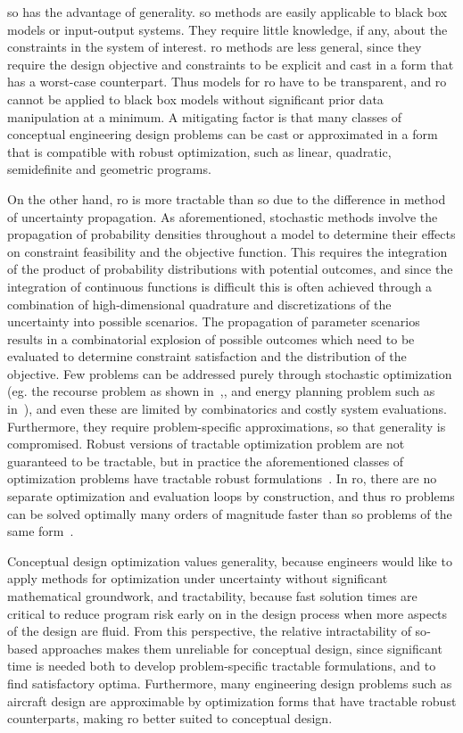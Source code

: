 \gls{so} has the advantage of generality.
\gls{so} methods are easily applicable to black box models or input-output systems.
They require little knowledge, if any, about the constraints in the system of interest.
\gls{ro} methods are less general, since they require
the design objective and constraints to be explicit and cast in a form that has a worst-case
counterpart. Thus models for \gls{ro} have to be transparent,
and \gls{ro} cannot be applied to black box models without significant prior data
manipulation at a minimum. A mitigating factor is that
many classes of conceptual engineering design problems can be cast or approximated in a form that
is compatible with robust optimization, such as linear, quadratic, semidefinite
and geometric programs.

On the other hand, \gls{ro} is more tractable than \gls{so} due to the difference in method of uncertainty propagation.
As aforementioned, stochastic methods involve the propagation of probability densities throughout a model
to determine their effects on constraint feasibility and the objective function.
This requires the integration of the product of probability distributions with potential outcomes,
and since the integration of continuous functions is difficult this is often achieved through
a combination of high-dimensional quadrature and discretizations of the uncertainty into
possible scenarios. The propagation of parameter
scenarios results in a combinatorial explosion of possible outcomes which need to be evaluated to determine constraint
satisfaction and the distribution of the objective. Few problems can be addressed purely
through stochastic optimization (eg. the recourse problem as
shown in~\cite{Kall1982},\cite{Higle1991}, and energy planning problem such as in~\cite{Pereira1991}), and
even these are limited by combinatorics and costly system evaluations. Furthermore, they require
problem-specific approximations, so that generality is compromised.
Robust versions of tractable optimization problem are not
guaranteed to be tractable, but in practice the aforementioned classes of optimization problems
have tractable robust formulations~\cite{Bertsimas2011}. In \gls{ro},
there are no separate optimization and evaluation
loops by construction, and thus \gls{ro} problems can be solved optimally
many orders of magnitude faster than \gls{so} problems of the same form~\cite{Bertsimas2011}.

Conceptual design optimization values generality, because engineers would like to
apply methods for optimization under uncertainty without significant mathematical groundwork,
and tractability, because fast solution times are critical
to reduce program risk early on in the design process when more aspects
of the design are fluid. From this perspective, the relative intractability of
\gls{so}-based approaches makes them unreliable for conceptual design, since significant time is
needed both to develop problem-specific tractable formulations, and to find satisfactory optima.
Furthermore,
many engineering design problems such as aircraft design are approximable by optimization
forms that have tractable robust counterparts, making \gls{ro} better suited
to conceptual design.

